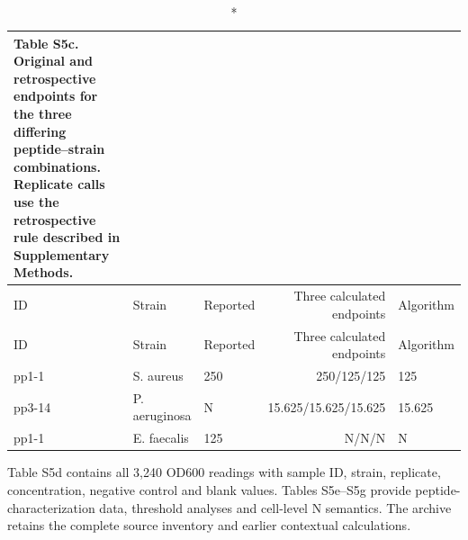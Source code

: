 \begingroup\small\setlength{\tabcolsep}{4pt}\renewcommand{\arraystretch}{1.15}
\begin{longtable}{lllrl}
\caption*{\textbf{Table S5c.} Original and retrospective endpoints for the three differing peptide--strain combinations. Replicate calls use the retrospective rule described in Supplementary Methods.}\\
\toprule
ID & Strain & Reported & Three calculated endpoints & Algorithm \\
\midrule\endfirsthead
ID & Strain & Reported & Three calculated endpoints & Algorithm \\
\midrule\endhead
pp1-1 & S. aureus & 250 & 250/125/125 & 125 \\
pp3-14 & P. aeruginosa & N & 15.625/15.625/15.625 & 15.625 \\
pp1-1 & E. faecalis & 125 & N/N/N & N \\
\bottomrule\end{longtable}\endgroup
\noindent Table S5d contains all 3,240 OD600 readings with sample ID, strain, replicate, concentration, negative control and blank values. Tables S5e--S5g provide peptide-characterization data, threshold analyses and cell-level N semantics. The archive retains the complete source inventory and earlier contextual calculations.
